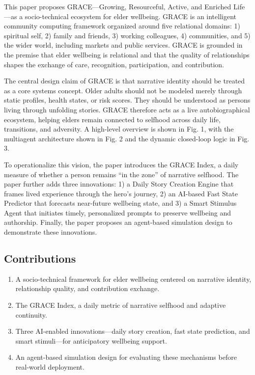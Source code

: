 \documentclass[
  journal,
]{IEEEtran}%
\providecommand{\tightlist}{%
  \setlength{\itemsep}{0pt}\setlength{\parskip}{0pt}}
\begin{document}
This paper proposes GRACE---Growing, Resourceful, Active, and Enriched
Life---as a socio-technical ecosystem for elder wellbeing. GRACE is an
intelligent community computing framework organized around five
relational domains: 1) spiritual self, 2) family and friends, 3) working
colleagues, 4) communities, and 5) the wider world, including markets
and public services. GRACE is grounded in the premise that elder
wellbeing is relational and that the quality of relationships shapes the
exchange of care, recognition, participation, and contribution.

The central design claim of GRACE is that narrative identity should be
treated as a core systems concept. Older adults should not be modeled
merely through static profiles, health states, or risk scores. They
should be understood as persons living through unfolding stories. GRACE
therefore acts as a live autobiographical ecosystem, helping elders
remain connected to selfhood across daily life, transitions, and
adversity. A high-level overview is shown in Fig. 1, with the multiagent
architecture shown in Fig. 2 and the dynamic closed-loop logic in Fig.
3.

To operationalize this vision, the paper introduces the GRACE Index, a
daily measure of whether a person remains ``in the zone'' of narrative
selfhood. The paper further adds three innovations: 1) a Daily Story
Creation Engine that frames lived experience through the hero's journey,
2) an AI-based Fast State Predictor that forecasts near-future wellbeing
state, and 3) a Smart Stimulus Agent that initiates timely, personalized
prompts to preserve wellbeing and authorship. Finally, the paper
proposes an agent-based simulation design to demonstrate these
innovations.

\subsection{Contributions}\label{contributions}

\begin{enumerate}
\def\labelenumi{\arabic{enumi}.}
\tightlist
\item
  A socio-technical framework for elder wellbeing centered on narrative
  identity, relationship quality, and contribution exchange.
\item
  The GRACE Index, a daily metric of narrative selfhood and adaptive
  continuity.
\item
  Three AI-enabled innovations---daily story creation, fast state
  prediction, and smart stimuli---for anticipatory wellbeing support.
\item
  An agent-based simulation design for evaluating these mechanisms
  before real-world deployment.
\end{enumerate}
\end{document}
